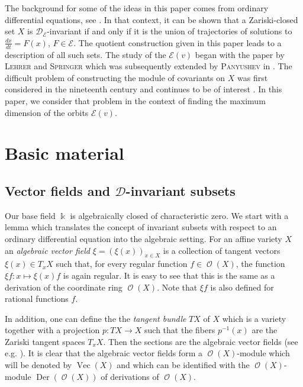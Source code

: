 \documentclass{amsart}
\theoremstyle{definition}
\theoremstyle{remark}
\begin{document}
The background for some of the ideas in this paper comes from ordinary
differential equations, see \cite{GrScWa2012Invariant-sets-for}. In that context, it can
be shown that a Zariski-closed set $X$ is ${\mathcal D}_{\mathcal E}$-invariant if and
only if it is the union of trajectories of solutions to $\frac{dx}{dt}=F(x)$, 
$F\in {\mathcal E}$. The quotient construction given in this paper leads to a
description of all such sets. The study of the ${\mathcal E}(v)$ began with the paper
\cite{LeSp1999A-note-concerning-} by {\textsc{{Lehrer}\/}} and {\textsc{{Springer}\/}}
which was subsequently extended by {\textsc{{Panyushev}\/}} in \cite{Pa2002On-covariants-of-r}. The
difficult problem of constructing the module of covariants on $X$ was first
considered in the nineteenth century \cite{El1913An-Introduction-to} and continues to be of interest
\cite{Do2008Covariants-and-the}. In this paper, we consider that problem in the context of finding
the maximum dimension of the orbits ${\mathcal E}(v)$.

{\par\medskip}
\section{Basic material}
\subsection{Vector fields and ${\mathcal D}$-invariant subsets}
Our base field ${\Bbbk}$ is algebraically closed of characteristic zero.
We start with a lemma which translates the concept of invariant subsets with respect to an ordinary differential equation into the algebraic setting. For an affine variety $X$ an {\it algebraic vector field} $\xi=(\xi(x))_{x\in X}$ is a collection of tangent vectors $\xi(x)\in T_{x}X$ such that, for every regular function $f \in \operatorname{\mathcal O}(X)$, the function $\xi f\colon x \mapsto \xi(x)f$ is again regular. It is easy to see that this is the same as a derivation of the coordinate ring $\operatorname{\mathcal O}(X)$. Note that $\xi f$ is also defined for rational functions $f$.

In addition, one can define the  the {\it tangent bundle\/} $TX$ of $X$ which is a variety together with a projection $p\colon TX \to X$ such that the fibers $p^{-1}(x)$ are the Zariski tangent spaces $T_{x}X$. Then the sections are the algebraic vector fields (see e.g. \cite[Appendix A.4.5]{Kr2014Algebraic-Transfor}). It is clear that the algebraic vector fields form a $\operatorname{\mathcal O}(X)$-module which will be denoted by $\operatorname{Vec}(X)$ and which can be identified with the $\operatorname{\mathcal O}(X)$-module $\operatorname{Der}(\operatorname{\mathcal O}(X))$ of derivations of $\operatorname{\mathcal O}(X)$.
\end{document}
